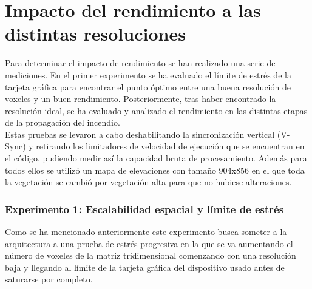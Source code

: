 \section[Evaluación del rendimiento]{Impacto del rendimiento a las distintas resoluciones}

Para determinar el impacto de rendimiento se han realizado una serie de mediciones. En el primer experimento se ha evaluado el límite de estrés de la tarjeta gráfica para encontrar el punto óptimo entre una buena resolución de voxeles y un buen rendimiento. Posteriormente, tras haber encontrado la resolución ideal, se ha evaluado y analizado el rendimiento en las distintas etapas de la propagación del incendio.\\

Estas pruebas se levaron a cabo deshabilitando la sincronización vertical (V-Sync) y retirando los limitadores de velocidad de ejecución que se encuentran en el código, pudiendo medir así la capacidad bruta de procesamiento. Además para todos ellos se utilizó un mapa de elevaciones con tamaño 904x856 en el que toda la vegetación se cambió por vegetación alta para que no hubiese alteraciones. \\

\subsubsection*{Experimento 1: Escalabilidad espacial y límite de estrés}
    Como se ha mencionado anteriormente este experimento busca someter a la arquitectura a una prueba de estrés progresiva en la que se va aumentando el número de voxeles de la matriz tridimensional comenzando con una resolución baja y llegando al límite de la tarjeta gráfica del dispositivo usado antes de saturarse por completo.\\

